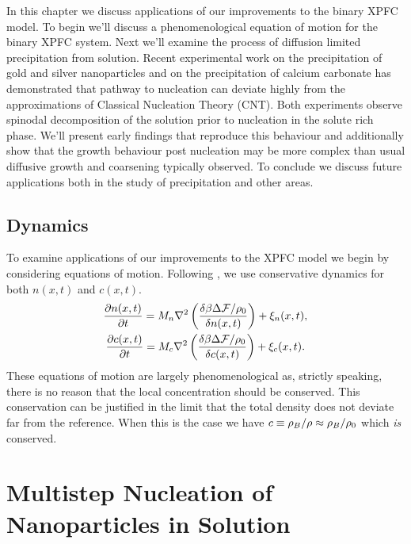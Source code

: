 \label{chapter:applications}

In this chapter we discuss applications of our improvements to the binary XPFC
model.  To begin we'll discuss a phenomenological equation of motion for the
binary XPFC system. Next we'll examine the process of diffusion limited
precipitation from solution.  Recent experimental work on the precipitation of
gold and silver nanoparticles\cite{LOH17} and on the precipitation of calcium
carbonate \cite{WALLACE13} has demonstrated that pathway to nucleation can
deviate highly from the approximations of Classical Nucleation Theory (CNT).
Both experiments observe spinodal decomposition of the solution prior to
nucleation in the solute rich phase. We'll present early findings that
reproduce this behaviour and additionally show that the growth behaviour post
nucleation may be more complex than usual diffusive growth and coarsening
typically observed. To conclude we discuss future applications both in the
study of precipitation and other areas.

\subsection{Dynamics} %

To examine applications of our improvements to the XPFC model we begin by
considering equations of motion. Following \cite{GREENWOOD11_BINARY}, we use
conservative dynamics for both $n(x, t)$ and $c(x, t)$.
%
\begin{gather}
    \frac{\partial n(x, t)}{\partial t} = 
        M_n \nabla^2\left(\frac{\delta \beta \Delta\mathcal{F} / \rho_0}{\delta n(x, t)}\right) 
        + \xi_n(x, t), \\ 
    \frac{\partial c(x, t)}{\partial t} = 
        M_c \nabla^2\left(\frac{\delta \beta \Delta \mathcal{F} / \rho_0}{\delta c(x, t)}\right)
        + \xi_c(x, t).
\end{gather}
%
These equations of motion are largely phenomenological as, strictly speaking,
there is no reason that the local concentration should be conserved.  This
conservation can be justified in the limit that the total density does not
deviate far from the reference. When this is the case we have $c \equiv \rho_B /
\rho \approx \rho_B / \rho_0$ which \textit{is} conserved.

\section{Multistep Nucleation of Nanoparticles in Solution} %

